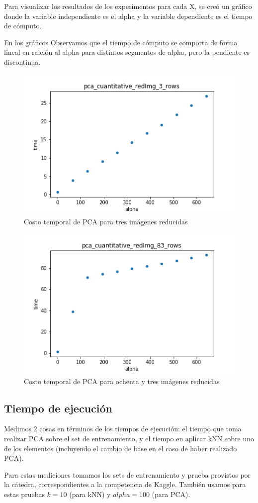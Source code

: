 Para visualizar los resultados de los experimentos para cada X, se creó un gráfico donde la variable independiente es el alpha y la variable dependiente es el tiempo de cómputo. 

En los gráficos Observamos que el tiempo de cómputo se comporta de forma lineal en ralción al alpha para distintos segmentos de alpha, pero la pendiente es discontinua.

\begin{figure}[H]
	\begin{center}
      \includegraphics[width=0.4\columnwidth]{imagenes/charuli-des/pca_cuantitative_redImg_3_rows.png}
      \caption{Costo temporal de PCA para tres imágenes reducidas}
      \end{center}
\end{figure}
\begin{figure}
	\begin{center}
    	\includegraphics[width=0.4\columnwidth]{imagenes/charuli-des/pca_cuantitative_redImg_83_rows.png}
     \caption{Costo temporal de PCA para ochenta y tres imágenes reducidas}
     \end{center}
\end{figure}

\subsection{Tiempo de ejecución}

Medimos 2 cosas en términos de los tiempos de ejecución: el tiempo que toma realizar PCA sobre el set de entrenamiento, y el tiempo en aplicar kNN sobre uno de los elementos (incluyendo el cambio de base en el caso de haber realizado PCA).

Para estas mediciones tomamos los sets de entrenamiento y prueba provistos por la cátedra, correspondientes a la competencia de Kaggle. También usamos para estas pruebas $k = 10$ (para kNN) y $alpha = 100$ (para PCA). 

